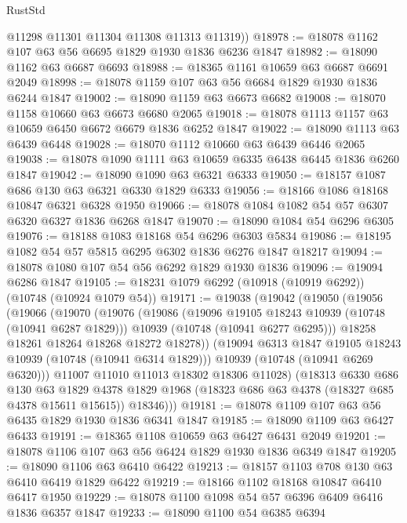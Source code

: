 \begin{lexlean}{RustStd}
\begin{coremodule}
{\begin{coremodule}
{{{{{        @11298
        @11301
        @11304
        @11308
        @11313
        @11319))
@18978 := @18078 @1162 @107 @63 @56 @6695 @1829 @1930 @1836 @6236 @1847
@18982 := @18090 @1162 @63 @6687 @6693
@18988 := @18365 @1161 @10659 @63 @6687 @6691 @2049
@18998 := @18078 @1159 @107 @63 @56 @6684 @1829 @1930 @1836 @6244 @1847
@19002 := @18090 @1159 @63 @6673 @6682
@19008 := @18070 @1158 @10660 @63 @6673 @6680 @2065
@19018 := @18078 @1113 @1157 @63 @10659 @6450 @6672 @6679 @1836 @6252 @1847
@19022 := @18090 @1113 @63 @6439 @6448
@19028 := @18070 @1112 @10660 @63 @6439 @6446 @2065
@19038 := @18078 @1090 @1111 @63 @10659 @6335 @6438 @6445 @1836 @6260 @1847
@19042 := @18090 @1090 @63 @6321 @6333
@19050 := @18157 @1087 @686 @130 @63 @6321 @6330 @1829 @6333
@19056 := @18166 @1086 @18168 @10847 @6321 @6328 @1950
@19066 := @18078 @1084 @1082 @54 @57 @6307 @6320 @6327 @1836 @6268 @1847
@19070 := @18090 @1084 @54 @6296 @6305
@19076 := @18188 @1083 @18168 @54 @6296 @6303 @5834
@19086 := @18195 @1082 @54 @57 @5815 @6295 @6302 @1836 @6276 @1847 @18217
@19094 := @18078 @1080 @107 @54 @56 @6292 @1829 @1930 @1836
@19096 := @19094 @6286 @1847
@19105 := @18231 @1079 @6292 (@10918 (@10919 @6292)) (@10748 (@10924 @1079 @54))
@19171 := @19038
    (@19042
      (@19050
        (@19056
          (@19066
            (@19070
              (@19076
                (@19086
                  (@19096 @19105 @18243 @10939 (@10748 (@10941 @6287 @1829)))
                  @10939
                  (@10748 (@10941 @6277 @6295)))
                @18258
                @18261
                @18264
                @18268
                @18272
                @18278))
            (@19094 @6313 @1847 @19105 @18243 @10939 (@10748 (@10941 @6314 @1829)))
            @10939
            (@10748 (@10941 @6269 @6320)))
          @11007
          @11010
          @11013
          @18302
          @18306
          @11028)
        (@18313
          @6330
          @686
          @130
          @63
          @1829
          @4378
          @1829
          @1968
          (@18323 @686 @63 @4378 (@18327 @685 @4378 @15611 @15615))
          @18346)))
@19181 := @18078 @1109 @107 @63 @56 @6435 @1829 @1930 @1836 @6341 @1847
@19185 := @18090 @1109 @63 @6427 @6433
@19191 := @18365 @1108 @10659 @63 @6427 @6431 @2049
@19201 := @18078 @1106 @107 @63 @56 @6424 @1829 @1930 @1836 @6349 @1847
@19205 := @18090 @1106 @63 @6410 @6422
@19213 := @18157 @1103 @708 @130 @63 @6410 @6419 @1829 @6422
@19219 := @18166 @1102 @18168 @10847 @6410 @6417 @1950
@19229 := @18078 @1100 @1098 @54 @57 @6396 @6409 @6416 @1836 @6357 @1847
@19233 := @18090 @1100 @54 @6385 @6394
}}}}}
\end{coremodule}}
\end{coremodule}
\end{lexlean}
